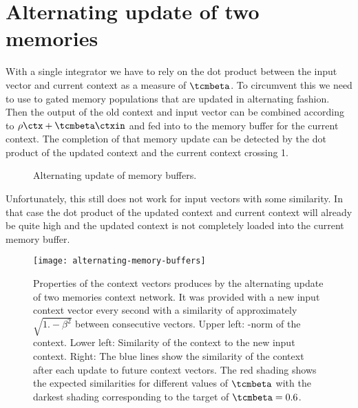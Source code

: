 \section{Alternating update of two memories}
With a single integrator we have to rely on the dot product between the input vector and current context as a measure of $\tcmbeta$.
To circumvent this we need to use to gated memory populations that are updated in alternating fashion.
Then the output of the old context and input vector can be combined according to $\rho \ctx + \tcmbeta \ctxin$ and fed into to the memory buffer for the current context.
The completion of that memory update can be detected by the dot product of the updated context and the current context crossing 1.
\begin{figure}
    \centering
    \caption{Alternating update of memory buffers.}\label{fig:ctx-bounded-integrator}
\end{figure}

Unfortunately, this still does not work for input vectors with some similarity.
In that case the dot product of the updated context and current context will already be quite high and the updated context is not completely loaded into the current memory buffer.
\begin{figure}
    \centering
    \texttt{[image: alternating-memory-buffers]}
    \caption{
        Properties of the context vectors produces by the alternating update of two memories context network.
        It was provided with a new input context vector every second with a similarity of approximately $\sqrt{1. - \beta^2}$ between consecutive vectors.
        Upper left: \ltwo-norm of the context.
        Lower left: Similarity of the context to the new input context.
        Right: The blue lines show the similarity of the context after each update to future context vectors.
        The red shading shows the expected similarities for different values of $\tcmbeta$ with the darkest shading corresponding to the target of $\tcmbeta = 0.6$.}\label{fig:alternating-memory-buffers}
\end{figure}



